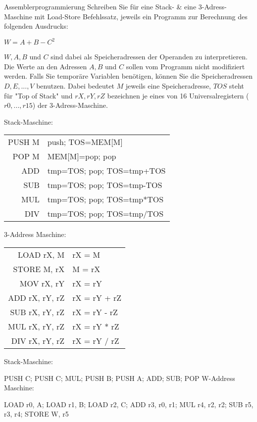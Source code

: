 \documentclass{article}
\begin{document}
\begin{exercise}{Assemblerprogrammierung}
  Schreiben Sie für eine Stack- \& eine 3-Adress-Maschine mit Load-Store Befehlssatz, jeweils ein Programm zur Berechnung des folgenden Ausdrucks:\points[8]\par
  \begin{center}$W = A + B - C^2$\end{center}
  $W, A, B$ und $C$ sind dabei als Speicheradressen der Operanden zu interpretieren. Die Werte an den Adressen $A, B$ und $C$ sollen vom Programm nicht modifiziert werden. Falls Sie temporäre Variablen benötigen, können Sie die Speicheradressen $D, E, ..., V$ benutzen. Dabei bedeutet $M$ jeweils eine Speicheradresse, $TOS$ steht für "Top of Stack" und $rX, rY, rZ$ bezeichnen je eines von 16 Universalregistern ($r0, ..., r15$) der 3-Adress-Maschine.

  \begin{multicols}{2}
    Stack-Maschine:\par
    \begin{tabular}{|r|l|}
      \hline
      PUSH M & push; TOS=MEM[M]          \\
      POP M  & MEM[M]=pop; pop           \\
      ADD    & tmp=TOS; pop; TOS=tmp+TOS \\
      SUB    & tmp=TOS; pop; TOS=tmp-TOS \\
      MUL    & tmp=TOS; pop; TOS=tmp*TOS \\
      DIV    & tmp=TOS; pop; TOS=tmp/TOS \\
      \hline
    \end{tabular}
    \columnbreak

    3-Address Maschine:\par
    \begin{tabular}{|r|l|}
      \hline
      LOAD rX, M     & rX = M       \\
      STORE M, rX    & M = rX       \\
      MOV rX, rY     & rX = rY      \\
      ADD rX, rY, rZ & rX = rY + rZ \\
      SUB rX, rY, rZ & rX = rY - rZ \\
      MUL rX, rY, rZ & rX = rY * rZ \\
      DIV rX, rY, rZ & rX = rY / rZ \\
      \hline
    \end{tabular}
  \end{multicols}

  \begin{solution}
    Stack-Maschine:\par PUSH C; PUSH C; MUL; PUSH B; PUSH A; ADD; SUB; POP W-Address Maschine:\par LOAD r0, A; LOAD r1, B; LOAD r2, C; ADD r3, r0, r1; MUL r4, r2, r2;  SUB r5, r3, r4; STORE W, r5
  \end{solution}
\end{exercise}
\end{document}
